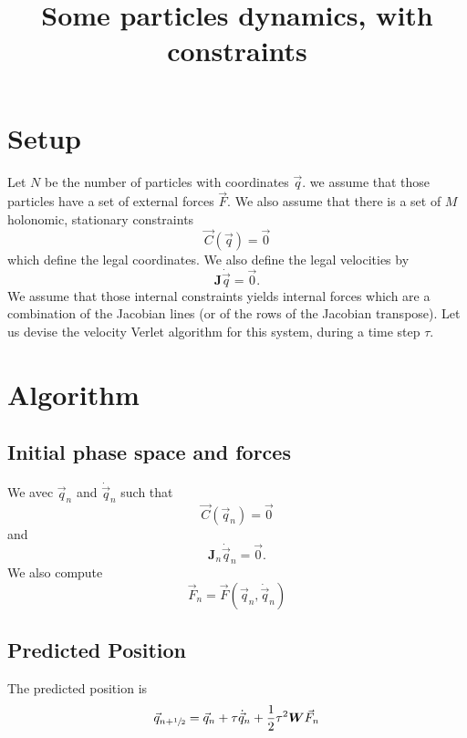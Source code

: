 \documentclass[aps,twocolumn]{revtex4}
\newcommand{\mymat}[1]{\boldsymbol{#1}}
\newcommand{\half}{\sfrac{1}{2}}
\newcommand{\q}{\vec{q}}
\newcommand{\dq}{\dot{\q}}
\newcommand{\C}{\vec{C}}
\newcommand{\J}{\mymat{J}}
\newcommand{\W}{\mymat{W}}
\begin{document}
\title{Some particles dynamics, with constraints}
\maketitle
\section{Setup}
Let $N$ be the number of particles with coordinates $\q$.	
we assume that those particles have a set of external forces $\vec{F}$.
We also assume that there is a set of $M$ holonomic, stationary constraints
\begin{equation}
	\C\left(\q\right) = \vec{0}
\end{equation}
which define the legal coordinates.
We also define the legal velocities by
\begin{equation}
	\J \dq = \vec{0}.
\end{equation}
We assume that those internal constraints yields internal forces which are
a combination of the Jacobian lines (or of the rows of the Jacobian transpose).
Let us devise the velocity Verlet algorithm for this system, during a time step $\tau$.

\section{Algorithm}

\subsection{Initial phase space and forces}
We avec $\q_n$ and $\dq_n$ such that
\begin{equation}
	\C(\q_n) = \vec{0}
\end{equation}
and
\begin{equation}
	\J_n \dq_n = \vec{0}.
\end{equation}
We also compute
\begin{equation}
	\vec{F}_n = \vec{F}\left(\q_n,\dq_n\right) 
\end{equation}

\subsection{Predicted Position}
The predicted position is
\begin{equation}
	\q_{n+\half} = \q_{n} + \tau \dq_n + \dfrac{1}{2} \tau^2 \W \vec{F}_n
\end{equation}
\end{document}
